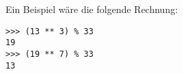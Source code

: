 Ein Beispiel wäre die folgende Rechnung:
\begin{lstlisting}
>>> (13 ** 3) % 33
19
>>> (19 ** 7) % 33
13
\end{lstlisting}
